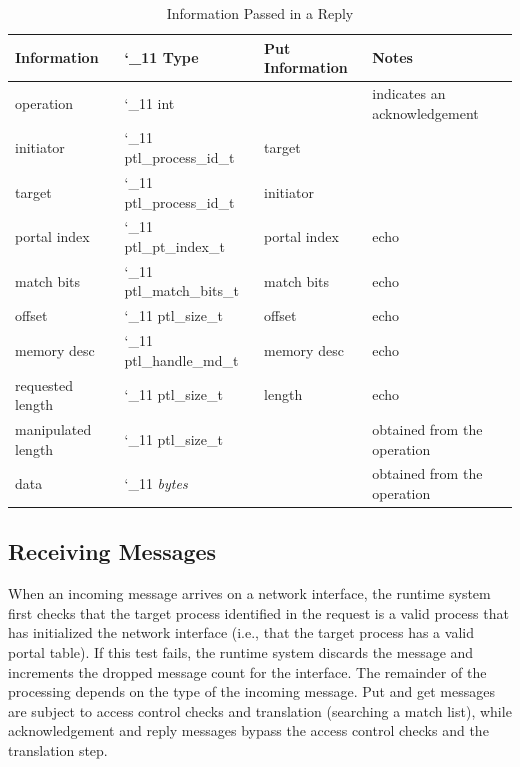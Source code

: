 \documentclass{sand-report}
\def\makeunderletter{\catcode`_11\relax}
\begin{document}
\begin{table}[htbp]
  \begin{center}\small
    \begin{tabular}{l>{\ttfamily\makeunderletter}lll}
Information        & \textrm{Type}    & Put Information               & Notes \\ \hline
operation          & int              &              & indicates an acknowledgement \\
initiator          & ptl_process_id_t & target       & \\
target             & ptl_process_id_t & initiator    & \\
portal index       & ptl_pt_index_t   & portal index & echo \\
match bits         & ptl_match_bits_t & match bits   & echo \\
offset             & ptl_size_t       & offset       & echo \\
memory desc        & ptl_handle_md_t  & memory desc  & echo \\
requested length   & ptl_size_t       & length       & echo \\
manipulated length & ptl_size_t       &              & obtained from the operation \\
data               & \emph{bytes}     &              & obtained from the operation \\
    \end{tabular}
    \caption{Information Passed in a Reply}
    \label{tab:reply-wire}
  \end{center}
\end{table}

\subsection{Receiving Messages}

When an incoming message arrives on a network interface, the runtime
system first checks that the target process identified in the request
is a valid process that has initialized the network interface (i.e.,
that the target process has a valid portal table).  If this test
fails, the runtime system discards the message and increments the
dropped message count for the interface.  The remainder of the
processing depends on the type of the incoming message.  Put and get
messages are subject to access control checks and translation
(searching a match list), while acknowledgement and reply messages
bypass the access control checks and the translation step.
\end{document}
